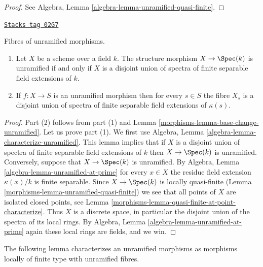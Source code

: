 \begin{proof}
See Algebra, Lemma \ref{algebra-lemma-unramified-quasi-finite}.
\end{proof}

\begin{lemma}
\label{morphisms-lemma-unramified-over-field}
\href{https://stacks.math.columbia.edu/tag/02G7}{\texttt{Stacks tag 02G7}}

Fibres of unramified morphisms.
\begin{enumerate}
\item Let $X$ be a scheme over a field $k$.
The structure morphism $X \to \Spec(k)$ is unramified if
and only if $X$ is a disjoint union of spectra of finite separable
field extensions of $k$.
\item If $f : X \to S$ is an unramified morphism then for every $s \in S$
the fibre $X_s$ is a disjoint union of spectra of finite separable field
extensions of $\kappa(s)$.
\end{enumerate}
\end{lemma}

\begin{proof}

Part (2) follows from part (1) and
Lemma \ref{morphisms-lemma-base-change-unramified}.
Let us prove part (1).
We first use Algebra, Lemma \ref{algebra-lemma-characterize-unramified}.
This lemma implies that if $X$ is a disjoint union of spectra of finite
separable field extensions of $k$ then $X \to \Spec(k)$ is unramified.
Conversely, suppose that $X \to \Spec(k)$ is unramified.
By Algebra, Lemma \ref{algebra-lemma-unramified-at-prime} for every $x \in X$
the residue field extension $\kappa(x)/k$ is
finite separable. Since $X \to \Spec(k)$ is locally
quasi-finite (Lemma \ref{morphisms-lemma-unramified-quasi-finite})
we see that all points of $X$ are isolated closed points, see
Lemma \ref{morphisms-lemma-quasi-finite-at-point-characterize}.
Thus $X$ is a discrete space, in particular the disjoint union
of the spectra of its local rings. By
Algebra, Lemma \ref{algebra-lemma-unramified-at-prime} again these
local rings are fields, and we win.
\end{proof}

The following lemma characterizes an unramified morphisms as
morphisms locally of finite type with unramified fibres.

